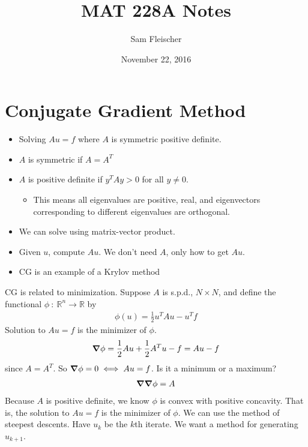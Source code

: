 \documentclass{article}
\title{MAT 228A Notes}
\author{Sam Fleischer}
\date{November 22, 2016}
\newcommand{\Rl}{\mathbb{R}}
\newcommand{\f}[3]{#1\ :\ #2 \rightarrow #3}
\begin{document}
    \maketitle

    \section{Conjugate Gradient Method}
    \begin{itemize}
        \item Solving $Au = f$ where $A$ is symmetric positive definite.
        \item $A$ is symmetric if $A = A^T$
        \item $A$ is positive definite if $y^TAy > 0$ for all $y \neq 0$.
        \begin{itemize}
            \item This means all eigenvalues are positive, real, and eigenvectors corresponding to different eigenvalues are orthogonal.
        \end{itemize}
        \item We can solve using matrix-vector product.
        \item Given $u$, compute $Au$.  We don't need $A$, only how to get $Au$.
        \item CG is an example of a Krylov method
    \end{itemize}
    CG is related to minimization.  Suppose $A$ is s.p.d., $N\times N$, and define the functional $\f{\phi}{\Rl^n}{\Rl}$ by
    \begin{align*}
        \phi(u) = \frac{1}{2}u^TAu - u^Tf
    \end{align*}
    Solution to $Au=f$ is the minimizer of $\phi$.
    \begin{align*}
        \grad\phi = \frac{1}{2}Au + \frac{1}{2}A^Tu - f = Au - f
    \end{align*}
    since $A = A^T$.  So $\grad\phi = 0 \iff Au = f$.  Is it a minimum or a maximum?
    \begin{align*}
        \grad\grad\phi = A
    \end{align*}
    Because $A$ is positive definite, we know $\phi$ is convex with positive concavity.  That is, the solution to $Au = f$ is the minimizer of $\phi$.  We can use the method of steepest descents.  Have $u_k$ be the $k$th iterate.  We want a method for generating $u_{k+1}$.
\end{document}
